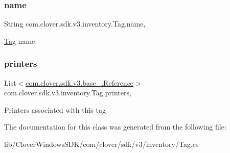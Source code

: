\subsubsection{\texorpdfstring{name}{name}}
{\footnotesize\ttfamily String com.\+clover.\+sdk.\+v3.\+inventory.\+Tag.\+name\hspace{0.3cm}{\ttfamily [get]}, {\ttfamily [set]}}



\hyperlink{classcom_1_1clover_1_1sdk_1_1v3_1_1inventory_1_1_tag}{Tag} name 

\mbox{\label{classcom_1_1clover_1_1sdk_1_1v3_1_1inventory_1_1_tag_a438066f64ef237f00ee7af37f43e9674}} 
\subsubsection{\texorpdfstring{printers}{printers}}
{\footnotesize\ttfamily List$<$\hyperlink{classcom_1_1clover_1_1sdk_1_1v3_1_1base___1_1_reference}{com.\+clover.\+sdk.\+v3.\+base\+\_\+.\+Reference}$>$ com.\+clover.\+sdk.\+v3.\+inventory.\+Tag.\+printers\hspace{0.3cm}{\ttfamily [get]}, {\ttfamily [set]}}



Printers associated with this tag 



The documentation for this class was generated from the following file\+:\begin{DoxyCompactItemize}
\item 
lib/\+Clover\+Windows\+S\+D\+K/com/clover/sdk/v3/inventory/Tag.\+cs\end{DoxyCompactItemize}
